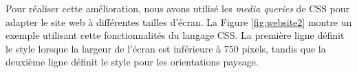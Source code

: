 Pour réaliser cette amélioration, nous avons utilisé les \textit{media queries} de CSS pour adapter le site web à différentes tailles d'écran.
La Figure \ref*{fig:website2} montre un exemple utilisant cette fonctionnalités du langage CSS.
La première ligne définit le style lorsque la largeur de l'écran est inférieure à 750 pixels, tandis que la deuxième ligne définit le style pour les orientations paysage.
